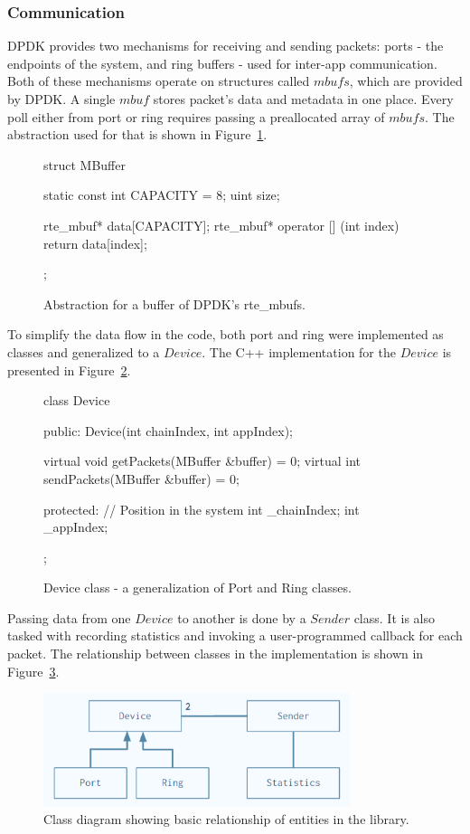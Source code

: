 \documentclass[english]{kththesis}
\begin{document}
\subsubsection{Communication}
DPDK provides two mechanisms for receiving and sending packets: ports - the endpoints of the system, and ring buffers - used for inter-app communication. Both of these mechanisms operate on structures called \(mbufs\), which are provided by DPDK. A single \(mbuf\) stores packet's data and metadata in one place. Every poll either from port or ring requires passing a preallocated array of \(mbufs\). The abstraction used for that is shown in Figure~\ref{fig:code1}.
\begin{figure}[!ht]
\begin{code}[language={C}, label=lst:mbuffer]
struct MBuffer
{
    static const int CAPACITY = 8;
    uint size;
    
    rte_mbuf* data[CAPACITY];
    rte_mbuf* operator [] (int index) 
    { 
        return data[index]; 
    }
};
\end{code}
\label{fig:code1}
\caption{Abstraction for a buffer of DPDK's rte\_mbufs.}
\end{figure}

To simplify the data flow in the code, both port and ring were implemented as classes and generalized to a \(Device\). The C++ implementation for the \(Device\) is presented in Figure~\ref{fig:device}. 
\begin{figure}[!ht]
\begin{code}[language={C}]
class Device
{
public:
    Device(int chainIndex, int appIndex);

    virtual void getPackets(MBuffer &buffer) = 0;
    virtual int sendPackets(MBuffer &buffer) = 0;

protected:
    // Position in the system
    int _chainIndex;
    int _appIndex;
};
\end{code}
\caption{Device class - a generalization of Port and Ring classes.}
\hspace*{2in}
\label{fig:device}
\end{figure}
Passing data from one \(Device\) to another is done by a \(Sender\) class. It is also tasked with recording statistics and invoking a user-programmed callback for each packet. The relationship between classes in the implementation is shown in Figure~\ref{fig:classdiagram}.
\begin{figure}[!ht]
  \centering
    \includegraphics[width=0.8\textwidth]{Fig13.png}
  \caption{Class diagram showing basic relationship of entities in the library.}
  \label{fig:classdiagram}
\end{figure}
\end{document}
